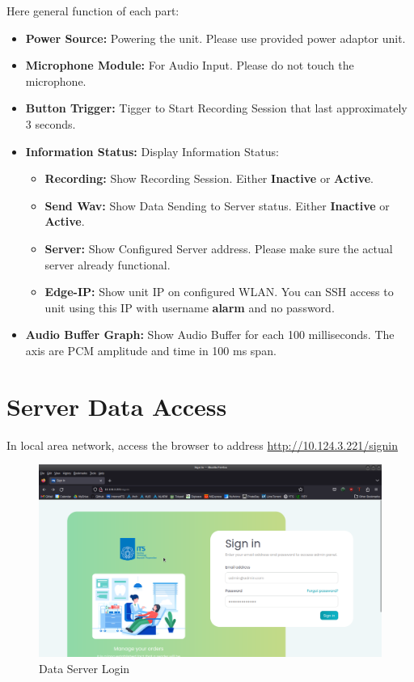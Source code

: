 \documentclass[a4paper,12pt,oneside,pdflatex,italian,final,twocolumn]{article}
\begin{document}
	\raggedright
	Here general function of each part:

	\begin{itemize}
		\item \textbf{Power Source:} Powering the unit. Please use provided power adaptor unit.

		\item \textbf{Microphone Module:} For Audio Input. Please do not touch the microphone.

		\item \textbf{Button Trigger:} Tigger to Start Recording Session that last approximately 3 seconds.

		\item \textbf{Information Status:} Display Information Status:

		\begin{itemize}
			\item \textbf{Recording:} Show Recording Session. Either \textbf{Inactive} or \textbf{Active}.

			\item \textbf{Send Wav:} Show Data Sending to Server status. Either \textbf{Inactive} or \textbf{Active}.

			\item \textbf{Server:} Show Configured Server address. Please make sure the actual server already functional.

			\item \textbf{Edge-IP:} Show unit IP on configured WLAN. You can SSH access to unit using this IP with username \textbf{alarm} and no password.
		\end{itemize}

		\item \textbf{Audio Buffer Graph:} Show Audio Buffer for each 100 milliseconds. The axis are PCM amplitude and time in 100 ms span.
	\end{itemize}

	\raggedright
	\section{Server Data Access}

	In local area network, access the browser to address \url{http://10.124.3.221/signin}

	\centering
	\begin{figure}[!ht]
		\centering
		\includegraphics[width=\textwidth,]{images/web_signin.png}
		\caption{Data Server Login}
	\end{figure}
	\raggedright
\end{document}
